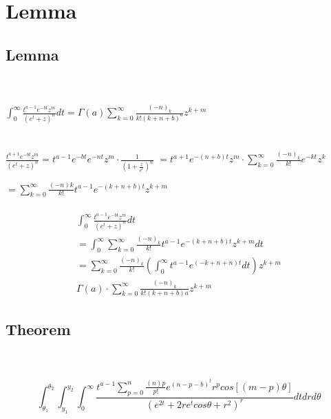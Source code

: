 \documentclass{article}
\begin{document}
\section{Lemma}
\subsection{Lemma}

\\\\

$\int_{0}^{\infty }\frac{t^{a-1}e^{-bt}z^m}{(e^{t}+z)^n}dt=\Gamma(a)\sum_{k=0}^{\infty}\frac{(-n)_k}{k!(k+n+b)^a}z^{k+m}$\\\\
\\
$\frac{t^{a+1}e^{-bt}z^m}{(e^{t}+z)^n}=t^{a-1}e^{-bt}e^{-nt}z^m \cdot \frac{1}{\left( 1+\frac{z}{e^t} \right)^n}$
$=t^{a+1}e^{-(n+b)t}z^m \cdot \sum_{k=0}^{\infty}\frac{(-n)_k}{k!}e^{-kt}z^k
$


$=\sum_{k=0}^{\infty }\frac{(-n)k}{k!}t^{a-1}e^{-(k+n+b)t}z^{k+m}$
\\\\
\begin{align}
\int_{0}^{\infty }\frac{t^{a-1}e^{-bt}z^m}{(e^t+z)^n}dt\\
= \int_{0}^{\infty }\sum_{k=0}^{\infty }\frac{(-n)_k}{k!}t^{a-1}e^{-(k+n+b)t}z^{k+m}dt\\
=\sum_{k=0}^{\infty }\frac{(-n)_k}{k!}\left( \int_{0}^{\infty } t^{a-1}e^{(-k+n+n)t}dt\right)z^{k+m}\\
\Gamma(a)\cdot \sum_{k=0}^{\infty }\frac{(-n)_k}{k!(k+n+b)a}z^{k+m}
\end{align}
\subsection{Theorem}
\\\\
\[\int_{\theta_1}^{\theta_2}\int_{y_1}^{y_2}\int_{0}^{\infty}\frac{t^{a-1}\sum_{p=0}^{n}\frac{(n)p}{p!}e^{(n-p-b)^{t}}r^{p}cos[(m-p)\theta]}{(e^{2t}+2re^{t}cos \theta +r^{2})^{r}}dtdrd\theta
\]
\end{document}
